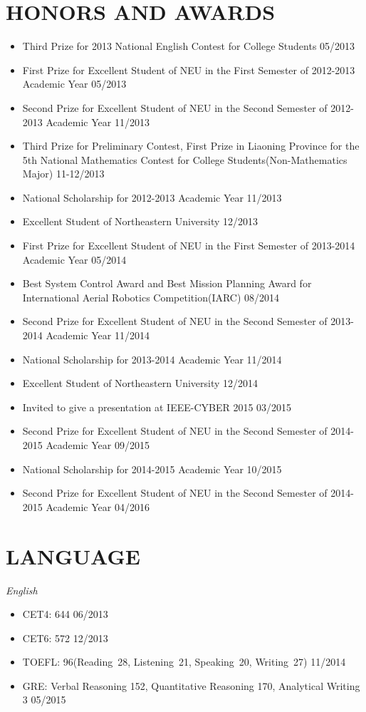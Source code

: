 \documentclass[margin, 10pt]{res} %
\begin{document}
\begin{resume}
\section{HONORS AND AWARDS}
\begin{itemize}
\item Third Prize for 2013 National English Contest for College Students \hfill 05/2013 
\item First Prize for Excellent Student of NEU in the First Semester of 2012-2013 Academic Year \hfill 05/2013
\item Second Prize for Excellent Student of NEU in the Second Semester of 2012-2013 Academic Year \hfill 11/2013
\item Third Prize for Preliminary Contest, First Prize in Liaoning Province for the 5th National Mathematics Contest for College Students(Non-Mathematics Major) \hfill 11-12/2013 
\item National Scholarship for 2012-2013 Academic Year \hfill 11/2013 
\item Excellent Student of Northeastern University \hfill 12/2013 
\item First Prize for Excellent Student of NEU in the First Semester of 2013-2014 Academic Year \hfill 05/2014
\item Best System Control Award and Best Mission Planning Award for International Aerial Robotics Competition(IARC) \hfill 08/2014 
\item Second Prize for Excellent Student of NEU in the Second Semester of 2013-2014 Academic Year \hfill 11/2014
\item National Scholarship for 2013-2014 Academic Year \hfill 11/2014 
\item Excellent Student of Northeastern University \hfill 12/2014 
\item Invited to give a presentation at IEEE-CYBER 2015 \hfill 03/2015 
\item Second Prize for Excellent Student of NEU in the Second Semester of 2014-2015 Academic Year \hfill 09/2015 
\item National Scholarship for 2014-2015 Academic Year \hfill 10/2015 
\item Second Prize for Excellent Student of NEU in the Second Semester of 2014-2015 Academic Year \hfill 04/2016 
\end{itemize}

\section{LANGUAGE}
{\sl English}
\begin{itemize}
\item CET4: 644 \hfill 06/2013 
\item CET6: 572 \hfill 12/2013 
\item TOEFL: 96(Reading\ 28, Listening\ 21, Speaking\ 20, Writing\ 27) \hfill 11/2014 
\item GRE: Verbal Reasoning 152, Quantitative Reasoning 170, Analytical Writing 3 \hfill 05/2015 
\end{itemize}


\end{resume}
\end{document}
